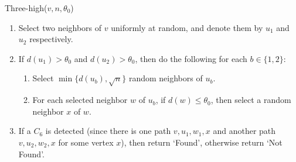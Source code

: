 \smallskip\noindent
\textsf{Three-high}($v,n,\theta_0$)
\begin{enumerate}
   \item Select two neighbors of $v$ uniformly at random, and denote them by $u_1$ and $u_2$ respectively.
   \item %
          If $d(u_1)> \theta_0$ and $d(u_2) > \theta_0$, then do the following for each $b\in \{1,2\}$:
   \begin{enumerate}
     \item  Select $\min\{d(u_b),\sqrt{n}\}$ random neighbors of $u_b$.
     \item For each selected neighbor $w$ of $u_b$,  if $d(w) \leq \theta_0$, then select a random neighbor $x$ of $w$. 
   \end{enumerate}
   \item If a $C_6$ is detected (since there is one path $v,u_1,w_1,x$ and another path $v,u_2,w_2,x$ for some vertex $x$), then return `Found', otherwise return `Not Found'.
\end{enumerate}
\fi


